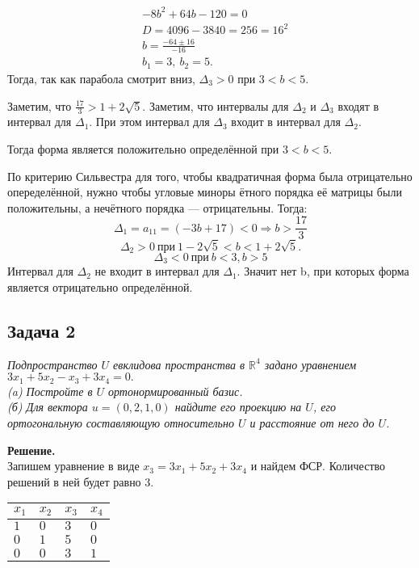 	\begin{align*}
	&-8b^2 + 64b - 120 = 0 \\
	&D = 4096 - 3840 = 256 = 16^2 \\ 
	&b = \frac{-64 \pm 16}{-16} \\
	&b_1 = 3,\ b_2 = 5.
	\end{align*}
	Тогда, так как парабола смотрит вниз, $\Delta_3 > 0$ при $3 < b < 5$.
	
	Заметим, что $\frac{17}{3} > 1 + 2\sqrt{5}$. 
	Заметим, что интервалы для $\Delta_2$ и $\Delta_3$ входят в интервал для $\Delta_1$. При этом интервал для $\Delta_3$ входит в интервал для $\Delta_2$.
	
	Тогда форма является положительно определённой при $3 < b < 5$.

	По критерию Сильвестра для того, чтобы квадратичная форма была отрицательно опеределённой, нужно чтобы угловые миноры ётного порядка её матрицы были положительны, а нечётного порядка — отрицательны. Тогда:
	\[
		\Delta_1 = a_{11} = (-3b + 17) < 0 \Rightarrow b > \frac{17}{3}
	\]	
	\[
		\Delta_2 > 0\ при\ 1 - 2\sqrt{5} < b < 1 + 2\sqrt{5}.
	\]	
	\[
		\Delta_3 < 0\ при\ b < 3, b > 5
	\]
	Интервал для $\Delta_2$ не входит в интервал для $\Delta_1$.
	Значит нет b, при которых форма является отрицательно определённой.
	
	\subsection{Задача 2} 
	\textit{Подпространство $U$ евклидова пространства в $\mathbb{R}^4$ задано уравнением $3x_1 + 5x_2 - x_3 + 3x_4 = 0.$\\
	(a) Постройте в $U$ ортонормированный базис.\\
	(б) Для вектора $u = (0,2,1,0)$ найдите его проекцию на $U$, его ортогональную составляющую относительно $U$ и расстояние от него до $U$.}

	\textbf{Решение.}\\
	Запишем уравнение в виде $x_3 = 3x_1 + 5x_2 + 3x_4$ и найдем ФСР. Количество решений в ней будет равно 3. \\
	\begin{tabular}[t]{|l|l|l|l|}
		\hline
		$x_1$	& $x_2$ & $x_3$ & $x_4$\\
		\hline
		$1$	& $0$ & $3$ & $0$\\
		\hline
		$0$	& $1$ & $5$ & $0$\\
		\hline
		$0$	& $0$ & $3$ & $1$\\
		\hline
	\end{tabular}
	
